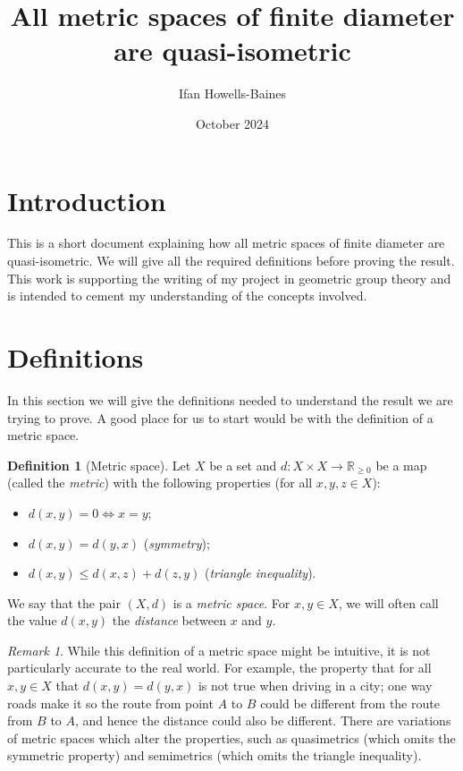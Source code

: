 \documentclass[12pt]{article}
\title{All metric spaces of finite diameter are quasi-isometric}
\author{Ifan Howells-Baines}
\date{October 2024}
\theoremstyle{definition}
\newtheorem*{definition}{Definition}
\theoremstyle{theorem}
\theoremstyle{remark}
\newtheorem*{remark}{Remark}
\begin{document}
\maketitle

\section{Introduction}
\label{sec:intro}

This is a short document explaining how all metric spaces of finite diameter are quasi-isometric. We will give all the required definitions before proving the result. This work is supporting the writing of my project in geometric group theory and is intended to cement my understanding of the concepts involved.

\section{Definitions}
\label{sec:definitions}

In this section we will give the definitions needed to understand the result we are trying to prove. A good place for us to start would be with the definition of a metric space.

\begin{definition}[Metric space]
  Let $X$ be a set and $d:X\times X\to \mathbb{R}_{\geq 0}$ be a map (called the \textit{metric}) with the following properties (for all $x,y,z\in X$):
  \begin{itemize}
  \item $d(x,y)=0 \Leftrightarrow x=y$;
  \item $d(x,y)=d(y,x)$ (\textit{symmetry});
  \item $d(x,y)\leq d(x,z)+d(z,y)$ (\textit{triangle inequality}).
  \end{itemize}
  We say that the pair $(X,d)$ is a \textit{metric space}. For $x,y\in X$, we will often call the value $d(x,y)$ the \textit{distance} between $x$ and $y$.
\end{definition}

\begin{remark}
  While this definition of a metric space might be intuitive, it is not particularly accurate to the real world. For example, the property that for all $x,y\in X$ that $d(x,y)=d(y,x)$ is not true when driving in a city; one way roads make it so the route from point $A$ to $B$ could be different from the route from $B$ to $A$, and hence the distance could also be different. There are variations of metric spaces which alter the properties, such as quasimetrics (which omits the symmetric property) and semimetrics (which omits the triangle inequality).
\end{remark}
\end{document}
